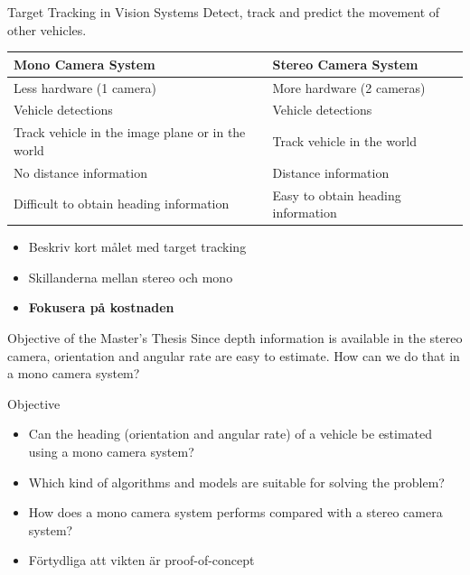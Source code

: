 \documentclass{beamer}
\renewcommand{\a}{\r{a}\xspace}
\renewcommand{\aa}{\"a\xspace}
\renewcommand{\o}{\"o\xspace}
\begin{document}
\begin{frame}{Target Tracking in Vision Systems}
	Detect, track and predict the movement of other vehicles.
	\begin{table}
		\centering
		\renewcommand{\arraystretch}{1.25}
		\setlength{\arrayrulewidth}{0.5pt}
		\begin{tabular}{p{5cm}|p{5cm}}
			\textbf{Mono Camera System} & \textbf{Stereo Camera System} \\
			\hline \hline
			Less hardware (1 camera) & More hardware (2 cameras) \\ \hline
			Vehicle detections & Vehicle detections \\ \hline
			Track vehicle in the image plane or in the world & Track vehicle in the world \\ \hline
			No distance information & Distance information \\ \hline
			Difficult to obtain heading information & Easy to obtain heading information
		\end{tabular}
	\end{table}

	\note
	{
		\begin{itemize}
			\item Beskriv kort m\a{}let med target tracking
			\item Skillanderna mellan stereo och mono
			\item \textbf{Fokusera p\a{} kostnaden}
		\end{itemize}
	}
\end{frame}

\begin{frame}{Objective of the Master's Thesis}
	Since depth information is available in the stereo camera, orientation and angular rate are easy to estimate.
	How can we do that in a mono camera system?
	\pause
	\begin{block}{Objective}
		\begin{itemize}
			\item Can the heading (orientation and angular rate) of a vehicle be estimated using a mono camera system?
			\item Which kind of algorithms and models are suitable for solving the problem?
			\item How does a mono camera system performs compared with a stereo camera system?
		\end{itemize}
	\end{block}

	\note
	{
		\begin{itemize}
			\item F\o{}rtydliga att vikten \aa{}r proof-of-concept
		\end{itemize}
	}
\end{frame}
\end{document}
